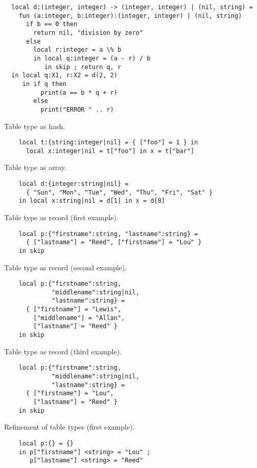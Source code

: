 \begin{verbatim}
  local d:(integer, integer) -> (integer, integer) | (nil, string) =
    fun (a:integer, b:integer):(integer, integer) | (nil, string)
      if b == 0 then
        return nil, "division by zero"
      else
        local r:integer = a \% b
        in local q:integer = (a - r) / b
           in skip ; return q, r
  in local q:X1, r:X2 = d(2, 2)
     in if q then
          print(a == b * q + r)
        else
          print("ERROR " .. r)
\end{verbatim}

Table type as hash.

\begin{verbatim}
    local t:{string:integer|nil} = { ["foo"] = 1 } in
      local x:integer|nil = t["foo"] in x = t["bar"]
\end{verbatim}

Table type as array.

\begin{verbatim}
    local d:{integer:string|nil} =
      { "Sun", "Mon", "Tue", "Wed", "Thu", "Fri", "Sat" }
    in local x:string|nil = d[1] in x = d[8]
\end{verbatim}

Table type as record (first example).

\begin{verbatim}
    local p:{"firstname":string, "lastname":string} =
      { ["lastname"] = "Reed", ["firstname"] = "Lou" }
    in skip
\end{verbatim}

Table type as record (second example).

\begin{verbatim}
    local p:{"firstname":string,
             "middlename":string|nil,
             "lastname":string} =
      { ["firstname"] = "Lewis",
        ["middlename"] = "Allan",
        ["lastname"] = "Reed" }
    in skip
\end{verbatim}

Table type as record (third example).

\begin{verbatim}
    local p:{"firstname":string,
             "middlename":string|nil,
             "lastname":string} =
      { ["firstname"] = "Lou",
        ["lastname"] = "Reed" }
    in skip
\end{verbatim}

Refinement of table types (first example).

\begin{verbatim}
    local p:{} = {}
    in p["firstname"] <string> = "Lou" ;
       p["lastname"] <string> = "Reed"
\end{verbatim}

